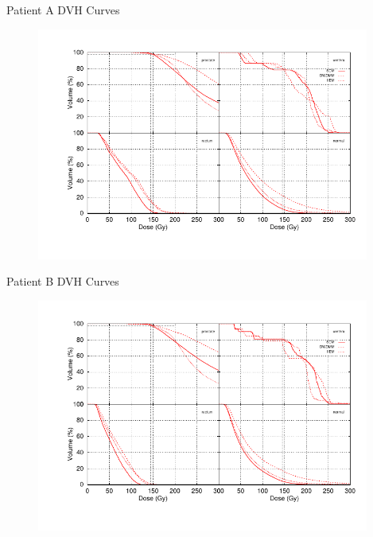 \documentclass{beamer}
\begin{document}
\begin{frame}{Patient A DVH Curves}

  \begin{figure}[h!]
    \begin{center}
      \includegraphics[width=4.3in]{figures/baron-all4x4.pdf}
    \end{center}
  \end{figure}

\end{frame}

\begin{frame}{Patient B DVH Curves}
  
  \begin{figure}[h!]
    \begin{center}
      \includegraphics[width=4.3in]{figures/carlson-all4x4.pdf}
    \end{center}
  \end{figure}

\end{frame}
\end{document}
